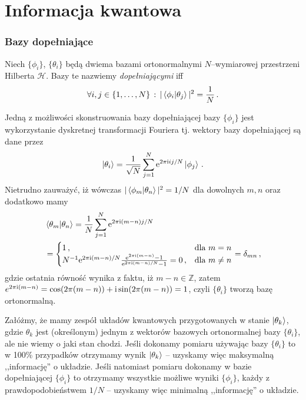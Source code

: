 \documentclass{myclass}
\begin{document}
\section{Informacja kwantowa}

\subsubsection*{Bazy dopełniające}
\begin{definition}
    Niech \(\{\phi_i\}\), \(\{\theta_i\}\)  będą dwiema bazami ortonormalnymi \(N\)--wymiarowej
    przestrzeni Hilberta \(\mathscr{H}\). Bazy te nazwiemy \textit{dopełniającymi} iff
    \begin{equation*}
        \forall i,j\in\{1,\ldots,N\}\,:\, |\braket{\phi_i}{\theta_j}|^2 = \frac{1}{N}\,.
    \end{equation*}
\end{definition}
Jedną z możliwości skonstruowania bazy dopełniającej bazy \(\{\phi_i\}\) jest wykorzystanie
dyskretnej transformacji Fouriera tj. wektory bazy dopełniającej są dane przez
\begin{equation*}
    \ket{\theta_i} = \frac{1}{\sqrt{N}}\sum_{j=1}^N \mathrm{e}^{2\pi\mathrm{i} ij/N}\ket{\phi_j}\,.
\end{equation*}
Nietrudno zauważyć, iż wówczas \(|\braket{\phi_m}{\theta_n}|^2 = 1/N\) dla dowolnych \(m, n\) oraz
dodatkowo mamy
\begin{equation*}
    \begin{split}
        &\braket{\theta_m}{\theta_n} = \frac{1}{N}\sum_{j=1}^N \mathrm{e}^{2\pi\mathrm{i}(m - n)j/N} \\
        &= \begin{cases}
            1\,,&\text{dla \(m=n\)}\\
            N^{-1}\mathrm{e}^{2\pi\mathrm{i}(m-n)/N}\frac{\mathrm{e}^{2\pi\mathrm{i}(m-n)} - 1}{\mathrm{e}^{2\pi\mathrm{i}(m-n)/N} - 1} = 0\,,&\text{dla \(m\neq n\)}
        \end{cases} = \delta_{mn}\,,
    \end{split}
\end{equation*}
gdzie ostatnia równość wynika z faktu, iż \(m-n\in\mathbb{Z}\), zatem \(e^{2\pi\mathrm{i}(m-n)} =
\cos(2\pi(m-n)) + \mathrm{i}\sin(2\pi(m-n)) = 1\), czyli \(\{\theta_i\}\) tworzą bazę ortonormalną.

Załóżmy, że mamy zespół układów kwantowych przygotowanych w stanie \(\ket{\theta_k}\), gdzie
\(\theta_k\) jest (określonym) jednym z wektorów bazowych ortonormalnej bazy \(\{\theta_i\}\), ale
nie wiemy o jaki stan chodzi. Jeśli dokonamy pomiaru używając bazy \(\{\theta_i\}\) to w 100\%
przypadków otrzymamy wynik \(\ket{\theta_k}\) -- uzyskamy więc maksymalną ,,informację'' o układzie.
Jeśli natomiast pomiaru dokonamy w bazie dopełniającej \(\{\phi_i\}\) to otrzymamy wszystkie możliwe
wyniki \(\{\phi_i\}\), każdy z prawdopodobieństwem \(1/N\) -- uzyskamy więc minimalną ,,informację''
o układzie.
\end{document}
